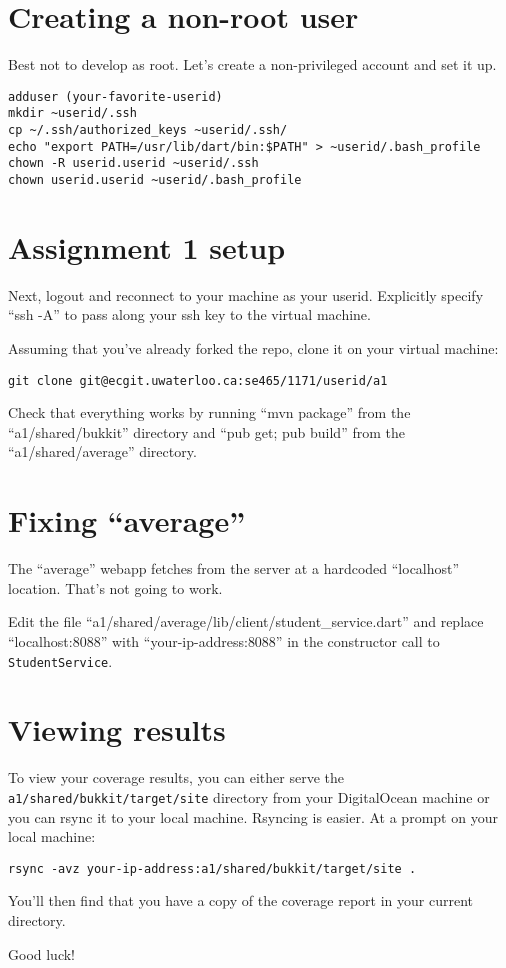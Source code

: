 \documentclass[10pt,hidelinks]{article}
\begin{document}
\section*{Creating a non-root user}
Best not to develop as root. Let's create a non-privileged account and set it up.

\begin{verbatim}
adduser (your-favorite-userid)
mkdir ~userid/.ssh
cp ~/.ssh/authorized_keys ~userid/.ssh/
echo "export PATH=/usr/lib/dart/bin:$PATH" > ~userid/.bash_profile
chown -R userid.userid ~userid/.ssh
chown userid.userid ~userid/.bash_profile
\end{verbatim}

\section*{Assignment 1 setup}
Next, logout and reconnect to your machine as your userid. Explicitly specify ``ssh -A'' to pass along your ssh key to the virtual machine.

Assuming that you've already forked the repo, clone it on your
virtual machine:

\begin{verbatim}
git clone git@ecgit.uwaterloo.ca:se465/1171/userid/a1
\end{verbatim}

Check that everything works by running ``mvn package'' from the ``a1/shared/bukkit'' directory and ``pub get; pub build'' from the ``a1/shared/average'' directory.

\section*{Fixing ``average''}
The ``average'' webapp fetches from the server at a hardcoded ``localhost'' location. That's not going to work.

Edit the file ``a1/shared/average/lib/client/student\_service.dart'' and replace ``localhost:8088'' with ``your-ip-address:8088'' in the constructor call to {\tt StudentService}.

\section*{Viewing results}
To view your coverage results, you can either serve the {\tt a1/shared/bukkit/target/site} directory from your DigitalOcean machine or you can rsync it to your local machine. Rsyncing is easier. At a prompt on your local machine:

\begin{verbatim}
rsync -avz your-ip-address:a1/shared/bukkit/target/site .
\end{verbatim}

You'll then find that you have a copy of the coverage report in your current directory.

Good luck!
\end{document}
